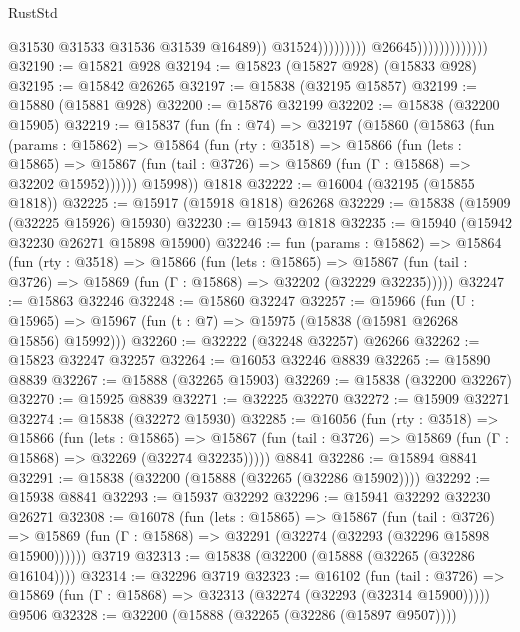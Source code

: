 \begin{lexlean}{RustStd}
\begin{coremodule}
                                                    @31530
                                                    @31533
                                                    @31536
                                                    @31539
                                                    @16489))
                                                @31524)))))))))
                              @26645)))))))))))))
@32190 := @15821 @928
@32194 := @15823 (@15827 @928) (@15833 @928)
@32195 := @15842 @26265
@32197 := @15838 (@32195 @15857)
@32199 := @15880 (@15881 @928)
@32200 := @15876 @32199
@32202 := @15838 (@32200 @15905)
@32219 := @15837
    (fun (fn : @74) =>
    @32197
      (@15860
        (@15863
          (fun (params : @15862) =>
          @15864
            (fun (rty : @3518) =>
            @15866
              (fun (lets : @15865) =>
              @15867 (fun (tail : @3726) => @15869 (fun (Γ : @15868) => @32202 @15952))))))
        @15998))
    @1818
@32222 := @16004 (@32195 (@15855 @1818))
@32225 := @15917 (@15918 @1818) @26268
@32229 := @15838 (@15909 (@32225 @15926) @15930)
@32230 := @15943 @1818
@32235 := @15940 (@15942 @32230 @26271 @15898 @15900)
@32246 := fun (params : @15862) =>
  @15864
    (fun (rty : @3518) =>
    @15866
      (fun (lets : @15865) =>
      @15867 (fun (tail : @3726) => @15869 (fun (Γ : @15868) => @32202 (@32229 @32235)))))
@32247 := @15863 @32246
@32248 := @15860 @32247
@32257 := @15966
    (fun (U : @15965) => @15967 (fun (t : @7) => @15975 (@15838 (@15981 @26268 @15856) @15992)))
@32260 := @32222 (@32248 @32257) @26266
@32262 := @15823 @32247 @32257
@32264 := @16053 @32246 @8839
@32265 := @15890 @8839
@32267 := @15888 (@32265 @15903)
@32269 := @15838 (@32200 @32267)
@32270 := @15925 @8839
@32271 := @32225 @32270
@32272 := @15909 @32271
@32274 := @15838 (@32272 @15930)
@32285 := @16056
    (fun (rty : @3518) =>
    @15866
      (fun (lets : @15865) =>
      @15867 (fun (tail : @3726) => @15869 (fun (Γ : @15868) => @32269 (@32274 @32235)))))
    @8841
@32286 := @15894 @8841
@32291 := @15838 (@32200 (@15888 (@32265 (@32286 @15902))))
@32292 := @15938 @8841
@32293 := @15937 @32292
@32296 := @15941 @32292 @32230 @26271
@32308 := @16078
    (fun (lets : @15865) =>
    @15867
      (fun (tail : @3726) =>
      @15869 (fun (Γ : @15868) => @32291 (@32274 (@32293 (@32296 @15898 @15900))))))
    @3719
@32313 := @15838 (@32200 (@15888 (@32265 (@32286 @16104))))
@32314 := @32296 @3719
@32323 := @16102
    (fun (tail : @3726) => @15869 (fun (Γ : @15868) => @32313 (@32274 (@32293 (@32314 @15900)))))
    @9506
@32328 := @32200 (@15888 (@32265 (@32286 (@15897 @9507))))

\end{coremodule}
\end{lexlean}
